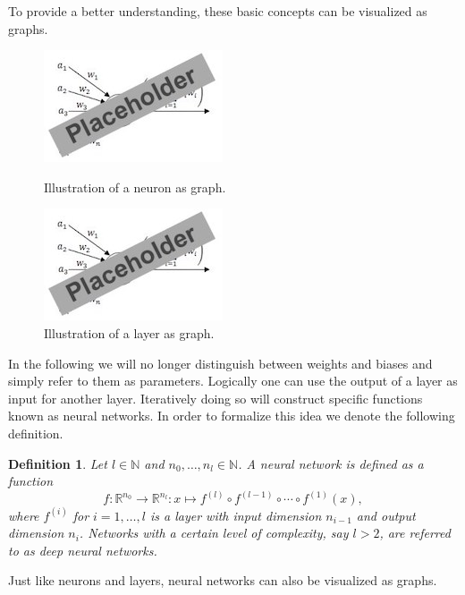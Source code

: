 \documentclass[11pt, a4paper]{article}
\newtheorem{definition}[theorem]{Definition}
\newcommand{\N}{\mathbb{N}}
\newcommand{\R}{\mathbb{R}}
\begin{document}
To provide a better understanding, these basic concepts can be visualized as graphs. \\

\begin{figure}[!h]
	\begin{minipage}[c]{0.5\linewidth}
	\centering
	\includegraphics{images/neuron.png}
      		\caption{Illustration of a neuron as graph.}
	\end{minipage}
	\hfill
	\begin{minipage}[c]{0.5\linewidth}
	\centering
	\includegraphics{images/neuron.png}
      		\caption{Illustration of a layer as graph.}
	\end{minipage}
\end{figure}

In the following we will no longer distinguish between weights and biases and simply refer to them as parameters. Logically one can use the output of a layer as input for another layer. Iteratively doing so will construct specific functions known as neural networks. In order to formalize this idea we denote the following definition. \\

\pagebreak
\begin{definition} \label{def:network}
Let $l \in \N$ and $n_0, \dots, n_l \in \N$. A neural network is defined as a function
\[ f : \R^{n_0} \to \R^{n_l} : x \mapsto f^{(l)} \circ f^{(l-1)} \circ \cdots \circ f^{(1)} (x),\]
where $f^{(i)}$ for $i=1, \dots, l$ is a layer with input dimension $n_{i-1}$ and output dimension $n_i$. Networks with a certain level of complexity, say $l>2$, are referred to as deep neural networks.
\end{definition}

Just like neurons and layers, neural networks can also be visualized as graphs.
\end{document}
